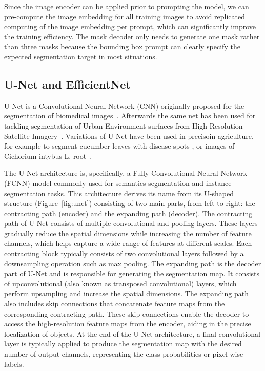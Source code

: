 \documentclass[runningheads]{llncs}
\begin{document}
Since the image encoder can be applied prior to prompting the model, we can pre-compute the image embedding for all training images to avoid replicated computing of the image embedding per prompt, which can significantly improve the training efficiency. The mask decoder only needs to generate one mask rather than three masks because the bounding box prompt can clearly specify the expected segmentation target in most situations. 

\subsection{U-Net and EfficientNet}

U-Net is a Convolutional Neural Network (CNN) originally proposed for the segmentation of biomedical images~\cite{ronneberger2015unet}.  Afterwards the same net has been used for tackling segmentation of Urban Environment surfaces from High Resolution Satellite Imagery~\cite{McGlinchy2019}. Variations of U-Net have been used in precisoin agriculture, for example to segment cucumber leaves with disease spots \cite{WANG2021106373}, or images of Cichorium intybus L. root~\cite{smith_segmentation_2020}.


The U-Net architecture is, specifically, a Fully Convolutional Neural Network (FCNN) model commonly used for semantics segmentation and instance segmentation tasks. This architecture derives its name from its U-shaped structure (Figure~\ref{fig:unet}) consisting of two main parts, from left to right: the contracting path (encoder) and the expanding path (decoder). The contracting path of U-Net consists of multiple convolutional and pooling layers. These layers gradually reduce the spatial dimensions while increasing the number of feature channels, which helps capture a wide range of features at different scales. Each contracting block typically consists of two convolutional layers followed by a downsampling operation such as max pooling. The expanding path is the decoder part of U-Net and is responsible for generating the segmentation map. It consists of upconvolutional (also known as transposed convolutional) layers, which perform upsampling and increase the spatial dimensions. The expanding path also includes skip connections that concatenate feature maps from the corresponding contracting path. These skip connections enable the decoder to access the high-resolution feature maps from the encoder, aiding in the precise localization of objects. At the end of the U-Net architecture, a final convolutional layer is typically applied to produce the segmentation map with the desired number of output channels, representing the class probabilities or pixel-wise labels. 
\end{document}

